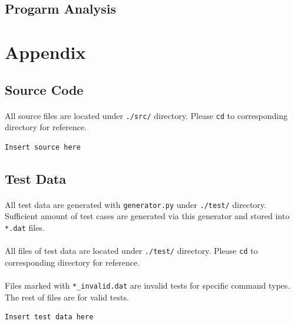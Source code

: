 \documentclass{article}
\begin{document}
        \subsection{Progarm Analysis}
            
    \cleardoublepage
    \section{Appendix}
        \subsection{Source Code}
            \paragraph{}
                All source files are located under \texttt{./src/} directory. Please \texttt{cd}
                to corresponding directory for reference.
            \begin{Verbatim}[gobble=8]
                Insert source here
            \end{Verbatim}
        \subsection{Test Data}
            \paragraph{}
                All test data are generated with \texttt{generator.py} under \texttt{./test/}
                directory. Sufficient amount of test cases are generated via this generator
                and stored into \texttt{*.dat} files.
            \paragraph{}
                All files of test data are located under \texttt{./test/} directory. Please
                \texttt{cd} to corresponding directory for reference.
            \paragraph{}
                Files marked with \texttt{*\_invalid.dat} are invalid tests for specific command
                types. The rest of files are for valid tests.
            \begin{Verbatim}[gobble=8]
                Insert test data here
            \end{Verbatim}
\end{document}
